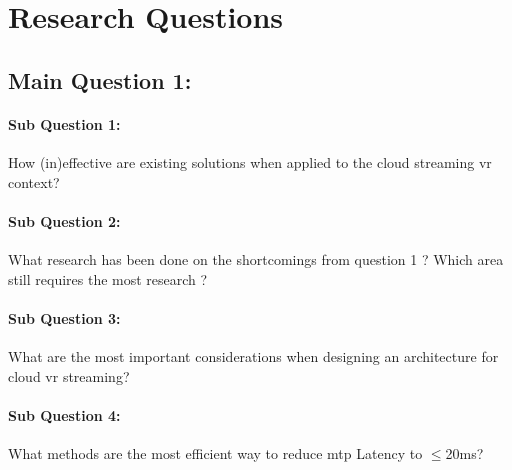 \section{Research Questions}

\subsection*{Main Question 1:} 
\paragraph{Sub Question 1:} How (in)effective are existing solutions when applied to the cloud streaming \acrshort{vr} context?
\paragraph{Sub Question 2:} What research has been done on the shortcomings from question 1 ? Which area still requires the most research ?
\paragraph{Sub Question 3:} What are the most important considerations when designing an architecture for cloud \acrshort{vr} streaming?
\paragraph{Sub Question 4:} What methods are the most efficient way to reduce \acrfull{mtp} Latency to $\leq$20\acrshort{ms}?
